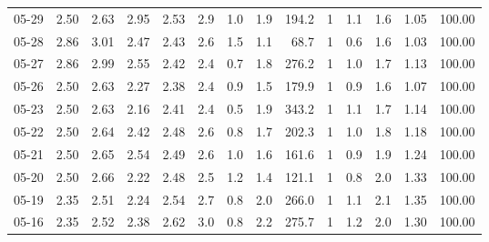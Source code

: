 \begin{threeparttable}
{\begin{tabular}{lrrrrrrrrrrrrr}
  05-29 &          2.50 &          2.63 &          2.95 &        2.53 &                 2.9 &                 1.0 &        1.9 &        194.2 &              1 &                 1.1 &              1.6 &            1.05 &                 100.00 \\
  05-28 &          2.86 &          3.01 &          2.47 &        2.43 &                 2.6 &                 1.5 &        1.1 &         68.7 &              1 &                 0.6 &              1.6 &            1.03 &                 100.00 \\
  05-27 &          2.86 &          2.99 &          2.55 &        2.42 &                 2.4 &                 0.7 &        1.8 &        276.2 &              1 &                 1.0 &              1.7 &            1.13 &                 100.00 \\
  05-26 &          2.50 &          2.63 &          2.27 &        2.38 &                 2.4 &                 0.9 &        1.5 &        179.9 &              1 &                 0.9 &              1.6 &            1.07 &                 100.00 \\
  05-23 &          2.50 &          2.63 &          2.16 &        2.41 &                 2.4 &                 0.5 &        1.9 &        343.2 &              1 &                 1.1 &              1.7 &            1.14 &                 100.00 \\
  05-22 &          2.50 &          2.64 &          2.42 &        2.48 &                 2.6 &                 0.8 &        1.7 &        202.3 &              1 &                 1.0 &              1.8 &            1.18 &                 100.00 \\
  05-21 &          2.50 &          2.65 &          2.54 &        2.49 &                 2.6 &                 1.0 &        1.6 &        161.6 &              1 &                 0.9 &              1.9 &            1.24 &                 100.00 \\
  05-20 &          2.50 &          2.66 &          2.22 &        2.48 &                 2.5 &                 1.2 &        1.4 &        121.1 &              1 &                 0.8 &              2.0 &            1.33 &                 100.00 \\
  05-19 &          2.35 &          2.51 &          2.24 &        2.54 &                 2.7 &                 0.8 &        2.0 &        266.0 &              1 &                 1.1 &              2.1 &            1.35 &                 100.00 \\
  05-16 &          2.35 &          2.52 &          2.38 &        2.62 &                 3.0 &                 0.8 &        2.2 &        275.7 &              1 &                 1.2 &              2.0 &            1.30 &                 100.00 \\

\end{tabular}}
\end{threeparttable}
